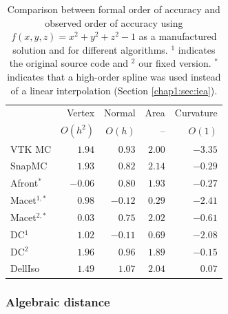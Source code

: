 \begin{table}[b]
\centering
\begin{tabular}{lrrrr}
\hline
 & Vertex  & Normal & Area & Curvature \\
 & $O(h^2)$ & $O(h)$ & --  & $O(1)$ \\
\hline
VTK MC          &  $1.94$    & $0.93$  & $2.00$      & $-3.35$ \\
SnapMC          &  $1.93$    & $0.82$   & $2.14$     & $-0.29$ \\
Afront$^*$          &  $-0.06$ & $0.80$   & $1.93$     & $-0.27$ \\
 Macet$^{1,*}$      &  $0.98$    & $-0.12$  & $0.29$     & $-2.41$ \\
 Macet$^{2,*}$      &  $0.03$  & $0.75$   & $2.02$     & $-0.61$ \\
 DC$^1$         &  $1.02$    & $-0.11$  & $0.69$     & $-2.08$ \\
 DC$^2$         &  $1.96$    & $0.96$   & $1.89$     & $-0.15$ \\
 DellIso      &  $1.49$    & $1.07$  & $2.04$      & $0.07$ \\
\hline
\end{tabular}
\caption{Comparison between formal order of accuracy and observed
  order of accuracy using $f(x,y,z) = x^2 + y^2 + z^2 -1$ as a manufactured solution 
  and for different algorithms. $^1$ indicates the original source 
    code and $^2$ our fixed version.
   $^*$ indicates that a high-order spline was used instead of a 
linear interpolation (Section \ref{chap1:sec:iea}).}
\label{tab:results}
\end{table}


\subsubsection{Algebraic distance}

